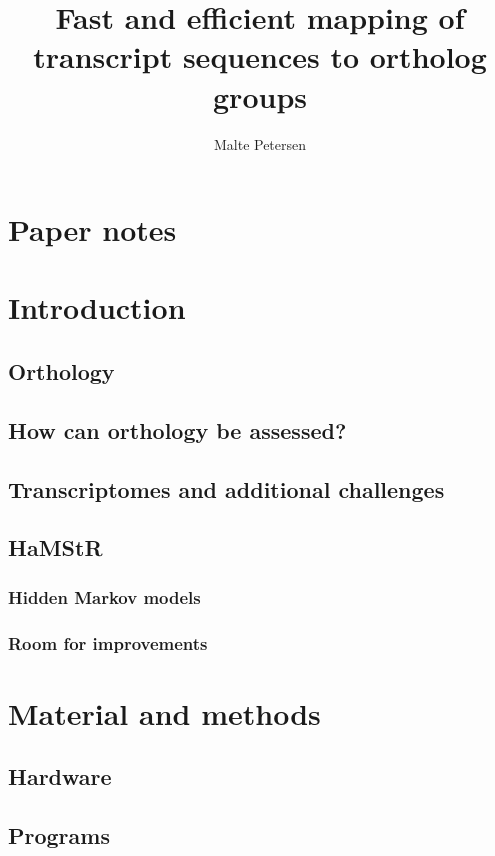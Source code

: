 \documentclass[a4paper,12pt]{scrreprt}
\title{Fast and efficient mapping of transcript sequences to ortholog groups}
\author{Malte Petersen}
\newcommand{\hamstr}{HaMStR\xspace}
\begin{document}
\linespread{1.3}
\maketitle
\pagestyle{headings}
\tableofcontents

\chapter*{Paper notes}
	



\chapter{Introduction}
	
	\section{Orthology}
		
	\section{How can orthology be assessed?}
		
	\section{Transcriptomes and additional challenges}
		
	\section{\hamstr}
		
		\subsection{Hidden Markov models}
			
		\subsection{Room for improvements}

\chapter{Material and methods}
	\section{Hardware}
		
	\section{Programs}
		
\end{document}
